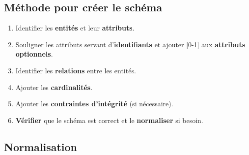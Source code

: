 \documentclass[a4paper]{article}
\begin{document}
\subsection{Méthode pour créer le schéma}





\begin{enumerate}
    \item Identifier les \textbf{entités} et leur \textbf{attributs}.
    \item Souligner les attributs servant d'\textbf{identifiants} et ajouter [0-1] aux \textbf{attributs optionnels}.
    \item Identifier les \textbf{relations} entre les entités.
    \item Ajouter les \textbf{cardinalités}.
    \item Ajouter les \textbf{contraintes d'intégrité} (si nécessaire).
    \item \textbf{Vérifier} que le schéma est correct et le \textbf{normaliser} si besoin.
\end{enumerate}










\subsection{Normalisation}
\end{document}
